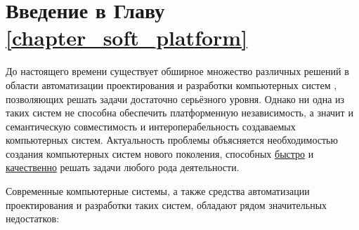 \section*{Введение в Главу \ref{chapter_soft_platform}}

До настоящего времени существует обширное множество различных решений в области автоматизации проектирования и разработки компьютерных систем \cite{iliadis2019tower}, позволяющих решать задачи достаточно серьёзного уровня. Однако ни одна из таких систем не способна обеспечить платформенную независимость, а значит и семантическую совместимость и интероперабельность создаваемых компьютерных систем. Актуальность проблемы объясняется необходимостью создания компьютерных систем нового поколения, способных \underline{быстро} и \underline{качественно} решать задачи любого рода деятельности.

Современные компьютерные системы, а также средства автоматизации проектирования и разработки таких систем, обладают рядом значительных недостатков:

